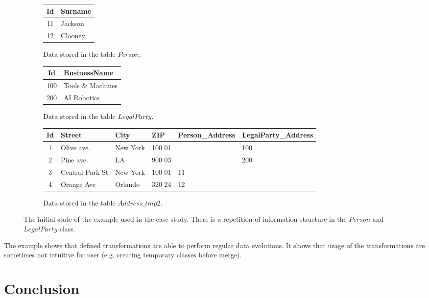 \documentclass[11pt]{article}
\begin{document}
\begin{figure}
\begin{subfigure}[b]{0.5\textwidth}
	\centering
	\begin{tabular}{| c | l |}
	 	\hline
		Id &  Surname \\ \hline  
		11 & Jackson  \\ \hline
		12 & Clooney  \\ \hline
	\end{tabular}
	\caption{Data stored in the table $Person$.}
\end{subfigure}
\begin{subfigure}[b]{0.5\textwidth}
	\centering
	\begin{tabular}{| c | l |}
	 	\hline
		Id &  BusinessName  \\ \hline  
		100 & Tools \& Machines  \\ \hline
		200 & AI Robotics \\ \hline
	\end{tabular}
	\caption{Data stored in the table $LegalParty$.}
\end{subfigure}
\begin{subfigure}[b]{\textwidth}
	\centering
	\begin{tabular}{| c | l | l | l | l | l |}
	 	\hline
		Id & Street & City & ZIP & Person\_Address & LegalParty\_Address\\ \hline  
		1 & Olive ave. & New York & 100 01 & & 100 \\ \hline
		2 & Pine ave. & LA & 900 03 & & 200  \\ \hline
		3 & Central Park St & New York & 100 01 & 11 &  \\ \hline
		4 & Orange Ave & Orlando & 320 24 & 12 &\\ \hline
	\end{tabular}
	\caption{Data stored in the table $Address\_tmp2$.}
\end{subfigure}
	\caption{The initial state of the example used in the case study. There is a repetition of information structure in the $Person$ and $LegalParty$ class.}
	\label{fig:case2}
\end{figure}

The example shows that defined transformations are able to perform regular data evolutions. It shows that usage of the transformations are sometimes not intuitive for user (e.g. creating temporary classes before merge).


\section{Conclusion}

\end{document}
